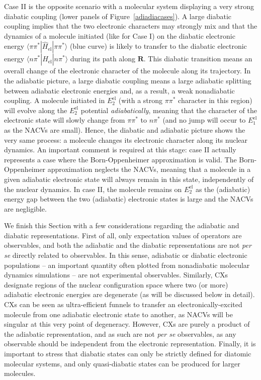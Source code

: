 \documentclass[9pt,bestpractices]{livecoms}
\begin{document}
Case II is the opposite scenario with a molecular system displaying a very strong diabatic coupling (lower panels of Figure~\ref{adiadiacases}). A large diabatic coupling implies that the two electronic characters may strongly mix and that the dynamics of a molecule initiated (like for Case I) on the diabatic electronic energy $\langle \pi\pi^\ast | \hat{H}_{\text{el}} | \pi\pi^\ast\rangle$ (blue curve) is likely to transfer to the diabatic electronic energy $\langle n\pi^\ast | \hat{H}_{\text{el}} | n\pi^\ast\rangle$ during its path along $\mathbf{R}$. This diabatic transition means an overall change of the electronic character of the molecule along its trajectory. In the adiabatic picture, a large diabatic coupling means a large adiabatic splitting between adiabatic electronic energies and, as a result, a weak nonadiabatic coupling. A molecule initiated in $E_2^{\text{el}}$ (with a strong $\pi\pi^\ast$ character in this region) will evolve along the $E_2^{\text{el}}$ potential \textit{adiabatically}, meaning that the character of the electronic state will slowly change from $\pi\pi^\ast$ to $n\pi^\ast$ (and no jump will occur to $E_1^{\text{el}}$ as the NACVs are small). Hence, the diabatic and adiabatic picture shows the very same process: a molecule changes its electronic character along its nuclear dynamics. An important comment is required at this stage: case II actually represents a case where the Born-Oppenheimer approximation is valid. The Born-Oppenheimer approximation neglects the NACVs, meaning that a molecule in a given adiabatic electronic state will always remain in this state, independently of the nuclear dynamics. In case II, the molecule remains on $E_2^{\text{el}}$ as the (adiabatic) energy gap between the two (adiabatic) electronic states is large and the NACVs are negligible. 

We finish this Section with a few considerations regarding the adiabatic and diabatic representations. First of all, only expectation values of operators are observables, and both the adiabatic and the diabatic representations are not \textit{per se} directly related to observables. In this sense, adiabatic or diabatic electronic populations -- an important quantity often plotted from nonadiabatic molecular dynamics simulations -- are not experimental observables. Similarly, CXs designate regions of the nuclear configuration space where two (or more) adiabatic electronic energies are degenerate (as will be discussed below in detail). CXs can be seen as ultra-efficient funnels to transfer an electronically-excited molecule from one adiabatic electronic state to another, as NACVs will be singular at this very point of degeneracy. However, CXs are purely a product of the adiabatic representation, and as such are not \textit{per se} observables, as any observable should be independent from the electronic representation. Finally, it is important to stress that diabatic states can only be strictly defined for diatomic molecular systems, and only quasi-diabatic states can be produced for larger molecules.\cite{mead1982conditions}
\end{document}
